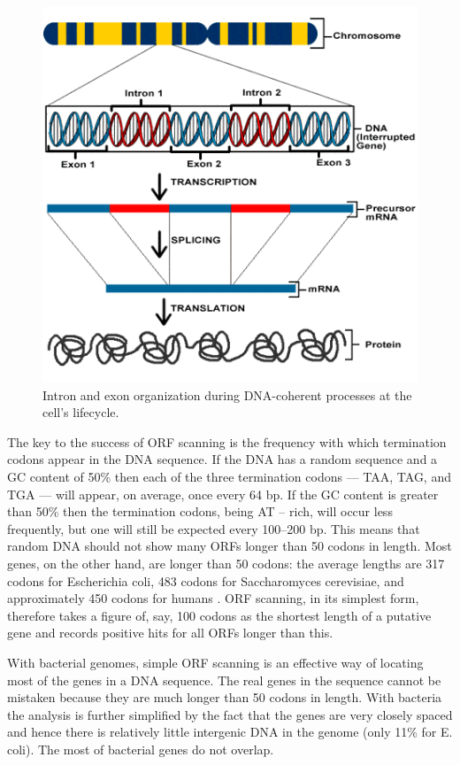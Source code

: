 \begin{figure}[!ht]
	\centering
	\includegraphics[width=.6\textwidth]{figures/eukaryotic_transcription_2.png}
	\caption{Intron and exon organization during DNA-coherent processes at the cell's lifecycle.\label{o:latex_friendly_zone}}
\end{figure}

The key to the success of ORF scanning is the frequency with which termination codons appear in the DNA sequence. 
If the DNA has a random sequence and a GC content of 50\% then each of the three termination codons — TAA, TAG, and TGA — will appear, on average, once every 64 bp. 
If the GC content is greater than 50\% then the termination codons, being AT – rich, will occur less frequently, but one will still be expected every 100–200 bp. 
This means that random DNA should not show many ORFs longer than 50 codons in length.
Most genes, on the other hand, are longer than 50 codons: the average lengths are 317 codons for Escherichia coli, 483 codons for Saccharomyces cerevisiae, and approximately 450 codons for humans \cite{FindingGenes}. 
ORF scanning, in its simplest form, therefore takes a figure of, say, 100 codons as the shortest length of a putative gene and records positive hits for all ORFs longer than this.

With bacterial genomes, simple ORF scanning is an effective way of locating most of the genes in a DNA sequence.
The real genes in the sequence cannot be mistaken because they are much longer than 50 codons in length. 
With bacteria the analysis is further simplified by the fact that the genes are very closely spaced and hence there is relatively little intergenic DNA in the genome (only 11\% for E. coli). 
The most of bacterial genes do not overlap.

